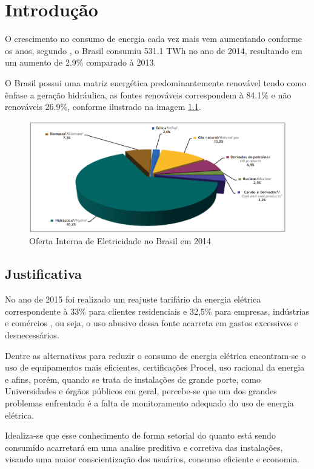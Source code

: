 \chapter{Introdução}
O crescimento no consumo de energia cada vez mais vem aumentando conforme os anos, segundo \cite{balanco_energetico}, o
Brasil consumiu 531.1 TWh no ano de 2014, resultando em um aumento de 2.9\% comparado à 2013.

O Brasil possui uma matriz energética predominantemente renovável tendo como ênfase a geração hidráulica, as fontes renováveis correspondem à 84.1\% e não renováveis 26.9\%, conforme ilustrado na imagem \ref{consumo-2014}.

\begin{figure}[h]
    \centering
    \includegraphics[keepaspectratio=true,scale=0.4]{figuras/consumo_energia_2014.eps}
    \caption{Oferta Interna de Eletricidade no Brasil em 2014}
    \label{consumo-2014}
\end{figure}

\section{Justificativa}
No ano de 2015 foi realizado um reajuste tarifário da energia elétrica correspondente à 33\% para clientes
residenciais e 32,5\% para empresas, indústrias e comércios \cite{aumento_energia}, ou seja, o uso abusivo dessa fonte
acarreta em gastos excessivos e desnecessários.

Dentre as alternativas para reduzir o consumo de energia elétrica encontram-se o uso de equipamentos mais eficientes, certificações Procel, uso racional da energia e afins, porém, quando se trata de instalações de grande porte, como Universidades e órgãos públicos em geral, percebe-se que um dos grandes problemas enfrentado é a falta de monitoramento adequado do uso de energia elétrica.

Idealiza-se que esse conhecimento de forma setorial do quanto está sendo consumido acarretará em uma analise preditiva e corretiva das instalações, visando uma maior conscientização dos usuários, consumo eficiente e economia.

